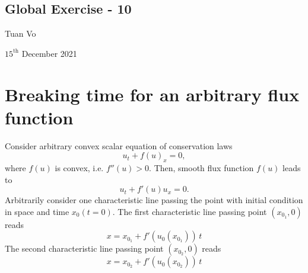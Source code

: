 \documentclass[12pt]{article}
\begin{document}
\begin{center}
	\section*{Global Exercise - 10}
\end{center}
\begin{center}
	Tuan Vo
\end{center}
\begin{center}
	$15^{\text{th}}$ December 2021
\end{center}
\section{Breaking time for an arbitrary flux function}
Consider arbitrary convex scalar equation of conservation laws 
\begin{equation}
	u_{t} + f(u)_{x} = 0, 
\end{equation}
where $f(u)$ is convex, i.e. $f''(u) > 0$. Then, smooth flux function $f(u)$ leads to
\begin{equation}
	u_{t} + f'(u) u_{x} = 0.
\end{equation}
Arbitrarily consider one characteristic line passing the point with initial condition in space and time $x_{0}(t=0)$. 
The first characteristic line passing point $(x_{0_{1}}, 0)$ reads
\begin{equation}\label{eq:firstline}
	x =  x_{0_{1}} + f'(u_{0}(x_{0_{1}}))\,t                                                              
\end{equation}
The second characteristic line passing point $(x_{0_{2}}, 0)$  reads
\begin{equation}\label{eq:secondline}
	x =  x_{0_{2}} + f'(u_{0}(x_{0_{2}}))\,t                                                              
\end{equation}
\end{document}
